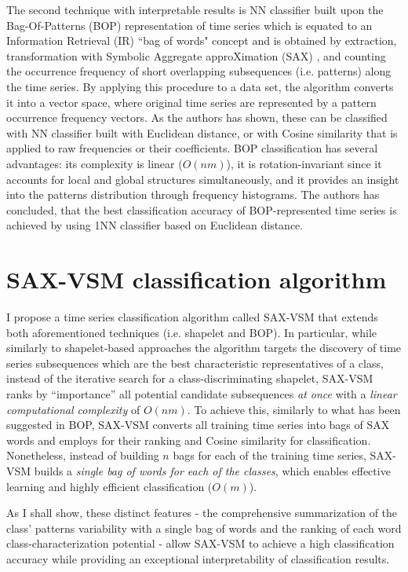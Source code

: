 The second technique with interpretable results is NN classifier built upon the Bag-Of-Patterns (BOP) representation of time series 
\cite{citeulike:10525778} which is equated to an Information Retrieval (IR) ``bag of words" concept and is obtained by extraction, 
transformation with Symbolic Aggregate approXimation (SAX) \cite{sax}, and counting the occurrence frequency of short overlapping 
subsequences (i.e. patterns) along the time series.
By applying this procedure to a data set, the algorithm converts it into a vector space, where original time series are 
represented by a pattern occurrence frequency vectors. As the authors has shown, these can be classified with NN classifier built with 
Euclidean distance, or with Cosine similarity that is applied to raw frequencies or their \tfidf coefficients. 
BOP classification has several advantages: its complexity is linear ($O(nm)$), it is rotation-invariant since it accounts for local and 
global structures simultaneously, and it provides an insight into the patterns distribution through frequency histograms.
The authors has concluded, that the best classification accuracy of BOP-represented time series is achieved by using 1NN classifier 
based on Euclidean distance. 

\section{SAX-VSM classification algorithm} \label{sax_vsm_background}
I propose a time series classification algorithm called \mbox{SAX-VSM} that extends both aforementioned techniques (i.e. shapelet and BOP). 
In particular, while similarly to shapelet-based approaches the algorithm targets the discovery of time series subsequences which 
are the best characteristic representatives of a class, 
instead of the iterative search for a class-discriminating shapelet, \mbox{SAX-VSM} ranks by “importance” all potential candidate 
subsequences \textit{at once} with a \textit{linear computational complexity} of $O(nm)$.
To achieve this, similarly to what has been suggested in BOP, \mbox{SAX-VSM} converts all training time series into bags of SAX 
words and employs \tfidf for their ranking and Cosine similarity for classification. 
Nonetheless, instead of building $n$ bags for each of the training time series, SAX-VSM builds a 
\textit{single bag of words for each of the classes}, which enables effective learning and highly efficient classification ($O(m)$).

As I shall show, these distinct features - the comprehensive summarization of the class' patterns variability with a single bag 
of words and the ranking of each word class-characterization potential - allow SAX-VSM to achieve a high classification accuracy
while providing an exceptional interpretability of classification results.

